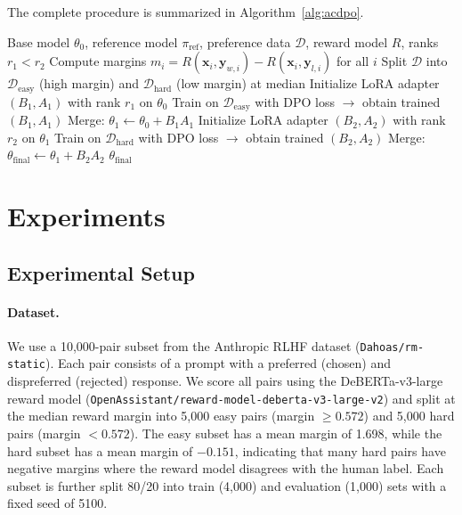 \documentclass{article}
\begin{document}
The complete procedure is summarized in Algorithm~\ref{alg:acdpo}.

\begin{algorithm}[t]
\caption{AC-DPO: Adaptive Capacity Direct Preference Optimization}
\label{alg:acdpo}
\begin{algorithmic}[1]
\REQUIRE Base model $\theta_0$, reference model $\pi_{\text{ref}}$, preference data $\mathcal{D}$, reward model $R$, ranks $r_1 < r_2$
\STATE Compute margins $m_i = R(\mathbf{x}_i, \mathbf{y}_{w,i}) - R(\mathbf{x}_i, \mathbf{y}_{l,i})$ for all $i$
\STATE Split $\mathcal{D}$ into $\mathcal{D}_{\text{easy}}$ (high margin) and $\mathcal{D}_{\text{hard}}$ (low margin) at median
\STATE Initialize LoRA adapter $(B_1, A_1)$ with rank $r_1$ on $\theta_0$
\STATE Train on $\mathcal{D}_{\text{easy}}$ with DPO loss $\rightarrow$ obtain trained $(B_1, A_1)$
\STATE Merge: $\theta_1 \leftarrow \theta_0 + B_1 A_1$
\STATE Initialize LoRA adapter $(B_2, A_2)$ with rank $r_2$ on $\theta_1$
\STATE Train on $\mathcal{D}_{\text{hard}}$ with DPO loss $\rightarrow$ obtain trained $(B_2, A_2)$
\STATE Merge: $\theta_{\text{final}} \leftarrow \theta_1 + B_2 A_2$
\RETURN $\theta_{\text{final}}$
\end{algorithmic}
\end{algorithm}



\section{Experiments}

\subsection{Experimental Setup}

\paragraph{Dataset.}
We use a 10,000-pair subset from the Anthropic RLHF dataset \citep{bai2022training} (\texttt{Dahoas/rm-static}). Each pair consists of a prompt with a preferred (chosen) and dispreferred (rejected) response. We score all pairs using the DeBERTa-v3-large reward model \citep{he2021deberta} (\texttt{OpenAssistant/reward-model-deberta-v3-large-v2}) and split at the median reward margin into 5,000 easy pairs (margin $\geq 0.572$) and 5,000 hard pairs (margin $< 0.572$). The easy subset has a mean margin of 1.698, while the hard subset has a mean margin of $-0.151$, indicating that many hard pairs have negative margins where the reward model disagrees with the human label. Each subset is further split 80/20 into train (4,000) and evaluation (1,000) sets with a fixed seed of 5100.
\end{document}
